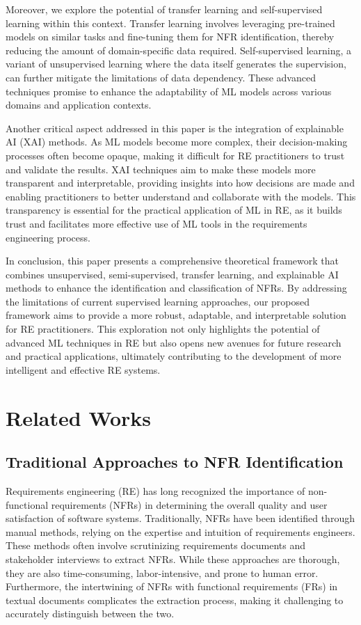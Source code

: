 \documentclass[sigconf,natbib=false]{acmart}
\begin{document}
Moreover, we explore the potential of transfer learning and self-supervised learning within this context. Transfer learning involves leveraging pre-trained models on similar tasks and fine-tuning them for NFR identification, thereby reducing the amount of domain-specific data required. Self-supervised learning, a variant of unsupervised learning where the data itself generates the supervision, can further mitigate the limitations of data dependency. These advanced techniques promise to enhance the adaptability of ML models across various domains and application contexts.

Another critical aspect addressed in this paper is the integration of explainable AI (XAI) methods. As ML models become more complex, their decision-making processes often become opaque, making it difficult for RE practitioners to trust and validate the results. XAI techniques aim to make these models more transparent and interpretable, providing insights into how decisions are made and enabling practitioners to better understand and collaborate with the models. This transparency is essential for the practical application of ML in RE, as it builds trust and facilitates more effective use of ML tools in the requirements engineering process.

In conclusion, this paper presents a comprehensive theoretical framework that combines unsupervised, semi-supervised, transfer learning, and explainable AI methods to enhance the identification and classification of NFRs. By addressing the limitations of current supervised learning approaches, our proposed framework aims to provide a more robust, adaptable, and interpretable solution for RE practitioners. This exploration not only highlights the potential of advanced ML techniques in RE but also opens new avenues for future research and practical applications, ultimately contributing to the development of more intelligent and effective RE systems.

\section{Related Works}

\subsection{Traditional Approaches to NFR Identification}
Requirements engineering (RE) has long recognized the importance of non-functional requirements (NFRs) in determining the overall quality and user satisfaction of software systems. Traditionally, NFRs have been identified through manual methods, relying on the expertise and intuition of requirements engineers. These methods often involve scrutinizing requirements documents and stakeholder interviews to extract NFRs. While these approaches are thorough, they are also time-consuming, labor-intensive, and prone to human error. Furthermore, the intertwining of NFRs with functional requirements (FRs) in textual documents complicates the extraction process, making it challenging to accurately distinguish between the two.
\end{document}

